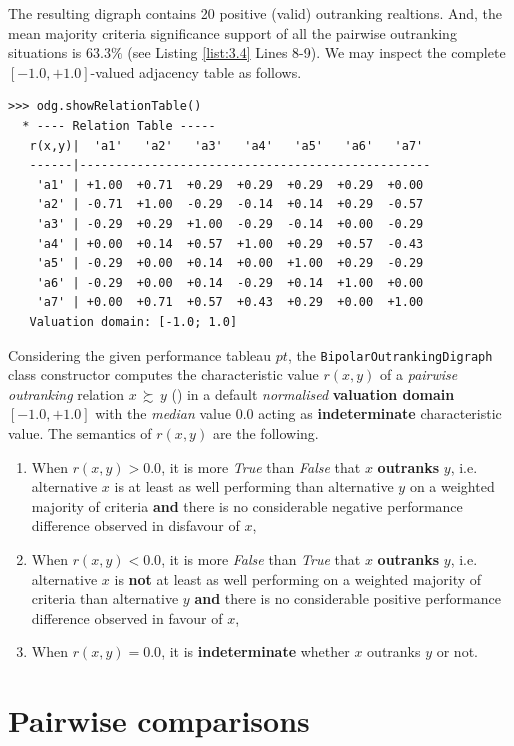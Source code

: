 The resulting digraph contains 20 positive (valid) outranking realtions. And, the mean majority criteria significance support of all the pairwise outranking situations is $63.3\%$ (see Listing \ref{list:3.4}  Lines 8-9). We may inspect the complete $[-1.0,+1.0]$-valued adjacency table as follows.
 \begin{lstlisting}[caption={Inspecting the valued adjacency table},label=list:3.5]
>>> odg.showRelationTable()
  * ---- Relation Table -----
   r(x,y)|  'a1'   'a2'   'a3'   'a4'   'a5'   'a6'   'a7'   
   ------|-------------------------------------------------
    'a1' | +1.00  +0.71  +0.29  +0.29  +0.29  +0.29  +0.00  
    'a2' | -0.71  +1.00  -0.29  -0.14  +0.14  +0.29  -0.57  
    'a3' | -0.29  +0.29  +1.00  -0.29  -0.14  +0.00  -0.29  
    'a4' | +0.00  +0.14  +0.57  +1.00  +0.29  +0.57  -0.43  
    'a5' | -0.29  +0.00  +0.14  +0.00  +1.00  +0.29  -0.29  
    'a6' | -0.29  +0.00  +0.14  -0.29  +0.14  +1.00  +0.00  
    'a7' | +0.00  +0.71  +0.57  +0.43  +0.29  +0.00  +1.00  
   Valuation domain: [-1.0; 1.0]
\end{lstlisting}

Considering the given performance tableau $pt$, the \texttt{BipolarOutrankingDigraph} class constructor computes the characteristic value $r(x,y)$ of a \emph{pairwise outranking} relation $x\, \succsim \,y$ (\citep{BIS-2013, ADT-L7}) in a default {\em normalised\/} {\bf valuation domain} $[-1.0,+1.0]$ with the {\em median\/} value $0.0$ acting as {\bf indeterminate} characteristic value. The semantics of $r(x,y)$ are the following.
\begin{enumerate}
\item When $r(x,y) > 0.0$, it is more {\em True\/} than {\em False\/} that $x$ {\bf outranks} $y$, i.e. alternative $x$ is at least as well performing than alternative $y$ on a weighted majority of criteria {\bf and} there is no considerable negative performance difference observed in disfavour of $x$,
\item When $r(x,y) < 0.0$, it is more {\em False\/} than {\em True\/} that $x$ {\bf outranks} $y$, i.e. alternative $x$ is {\bf not} at least as well performing on a weighted majority of criteria than alternative $y$ {\bf and} there is no considerable positive performance difference observed in favour of $x$,
\item When $r(x,y) = 0.0$, it is {\bf indeterminate} whether $x$ outranks $y$ or not.
\end{enumerate}

\section{Pairwise comparisons}
\label{sec:3.3}

